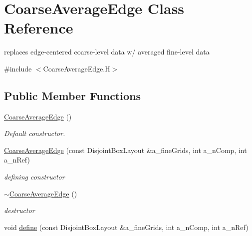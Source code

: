 \hypertarget{class_coarse_average_edge}{\section{Coarse\-Average\-Edge Class Reference}
\label{class_coarse_average_edge}
}


replaces edge-\/centered coarse-\/level data w/ averaged fine-\/level data  




{\ttfamily \#include $<$Coarse\-Average\-Edge.\-H$>$}

\subsection*{Public Member Functions}
\begin{DoxyCompactItemize}
\item 
\hypertarget{class_coarse_average_edge_ab19f8a588cdb3b2ecaacd58e0340aa6d}{\hyperlink{class_coarse_average_edge_ab19f8a588cdb3b2ecaacd58e0340aa6d}{Coarse\-Average\-Edge} ()}\label{class_coarse_average_edge_ab19f8a588cdb3b2ecaacd58e0340aa6d}

\begin{DoxyCompactList}\small\item\em Default constructor. \end{DoxyCompactList}\item 
\hypertarget{class_coarse_average_edge_a587bc75ddb480a189e5e619a3b23dc62}{\hyperlink{class_coarse_average_edge_a587bc75ddb480a189e5e619a3b23dc62}{Coarse\-Average\-Edge} (const Disjoint\-Box\-Layout \&a\-\_\-fine\-Grids, int a\-\_\-n\-Comp, int a\-\_\-n\-Ref)}\label{class_coarse_average_edge_a587bc75ddb480a189e5e619a3b23dc62}

\begin{DoxyCompactList}\small\item\em defining constructor \end{DoxyCompactList}\item 
\hypertarget{class_coarse_average_edge_a9f9f40f39d1de2bee0f060e8a1829df6}{\hyperlink{class_coarse_average_edge_a9f9f40f39d1de2bee0f060e8a1829df6}{$\sim$\-Coarse\-Average\-Edge} ()}\label{class_coarse_average_edge_a9f9f40f39d1de2bee0f060e8a1829df6}

\begin{DoxyCompactList}\small\item\em destructor \end{DoxyCompactList}\item 
\hypertarget{class_coarse_average_edge_afd652746f2915f00ed0b2aaad8888f4f}{void \hyperlink{class_coarse_average_edge_afd652746f2915f00ed0b2aaad8888f4f}{define} (const Disjoint\-Box\-Layout \&a\-\_\-fine\-Grids, int a\-\_\-n\-Comp, int a\-\_\-n\-Ref)}\label{class_coarse_average_edge_afd652746f2915f00ed0b2aaad8888f4f}


\end{DoxyCompactItemize}
